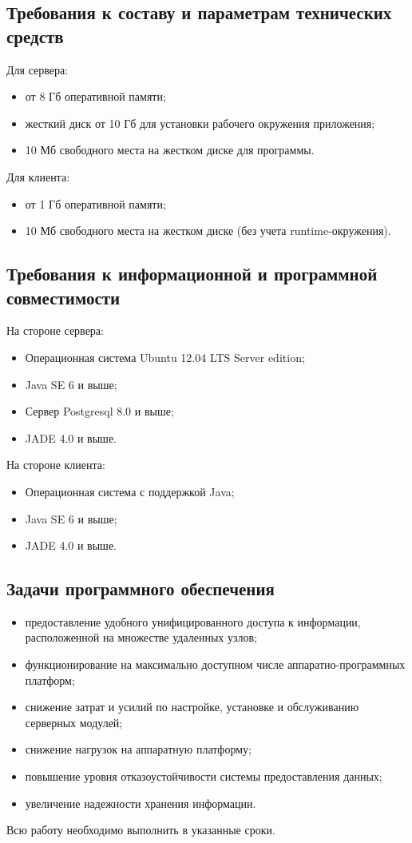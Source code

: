 \subsection*{Требования к составу и параметрам технических средств}
Для сервера:
\begin{itemize}
\item от 8 Гб оперативной памяти;
\item жесткий диск от 10 Гб для установки рабочего окружения приложения; 
\item 10 Мб свободного места на жестком диске для программы.
\end{itemize}

Для клиента:
\begin{itemize}
\item от 1 Гб оперативной памяти;
\item 10 Мб свободного места на жестком диске (без учета runtime-окружения).
\end{itemize}

\subsection*{Требования к информационной и программной совместимости}
На стороне сервера:
\begin{itemize}
\item Операционная система Ubuntu 12.04 LTS Server edition;
\item Java SE 6 и выше;
\item Сервер Postgresql 8.0 и выше;
\item JADE 4.0 и выше.
\end{itemize}

На стороне клиента:
\begin{itemize}
\item Операционная система с поддержкой Java;
\item Java SE 6 и выше;
\item JADE 4.0 и выше.
\end{itemize}

\subsection*{Задачи программного обеспечения}
\begin{itemize}
\item предоставление удобного унифицированного доступа к информации, расположенной на множестве удаленных узлов;
\item функционирование на максимально доступном числе аппаратно-программных платформ;
\item снижение затрат и усилий по настройке, установке и обслуживанию серверных модулей;
\item снижение нагрузок на аппаратную платформу;
\item повышение уровня отказоустойчивости системы предоставления данных;
\item увеличение надежности хранения информации.
\end{itemize}

Всю работу необходимо выполнить в указанные сроки.
